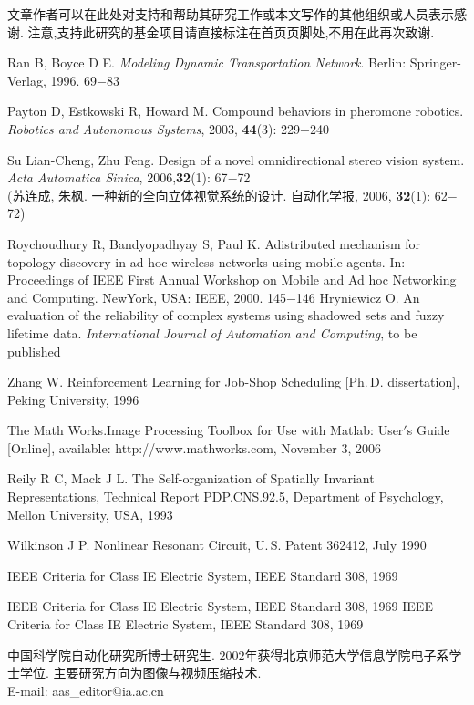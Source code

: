 \documentclass{Style/aas}
\begin{document}
\begin{multicols}{2}
文章作者可以在此处对支持和帮助其研究工作或本文写作的其他组织或人员表示感谢.
注意,支持此研究的基金项目请直接标注在首页页脚处,不用在此再次致谢.

\begin{thebibliography}{99}
 \addtolength{\itemsep}{0.2em} 
 Ran B, Boyce D E. {\sl Modeling Dynamic Transportation Network}.
Berlin: Springer-Verlag, 1996. 69$-$83

 Payton D, Estkowski R, Howard M. Compound behaviors in pheromone robotics. {\sl Robotics and Autonomous Systems}, 2003, {\bf 44}(3): 229$-$240

 Su Lian-Cheng, Zhu Feng. Design of a novel omnidirectional stereo vision system. {\sl  Acta Automatica Sinica}, 2006,{\bf 32}(1): 67$-$72\\ (苏连成, 朱枫. 一种新的全向立体视觉系统的设计. 自动化学报, 2006, {\bf 32}(1): 62$-$72)

 Roychoudhury R, Bandyopadhyay S, Paul K. Adistributed mechanism for topology discovery in ad hoc wireless networks using mobile agents. In: Proceedings of IEEE First Annual Workshop on Mobile and Ad hoc Networking and Computing. NewYork, USA: IEEE, 2000. 145$-$146
  Hryniewicz O. An evaluation of the reliability of complex systems using shadowed sets and fuzzy lifetime data. {\sl International Journal of Automation and Computing}, to be published
 
  Zhang W. Reinforcement Learning for Job-Shop Scheduling [Ph.\,D.
dissertation], Peking University, 1996

 The Math Works.Image Processing Toolbox for Use with Matlab: User$'$s Guide [Online], available: http://www.mathworks.com, November 3, 2006

 Reily R C, Mack J L. The Self-organization of Spatially Invariant
Representations, Technical Report PDP.CNS.92.5, Department of
Psychology, Mellon University, USA, 1993

 Wilkinson J P. Nonlinear Resonant Circuit, U.\,S. Patent 362412, July 1990

 IEEE Criteria for Class IE Electric System, IEEE Standard 308, 1969

 IEEE Criteria for Class IE Electric System, IEEE Standard 308, 1969
 IEEE Criteria for Class IE Electric System, IEEE Standard 308, 1969
\end{thebibliography}

\begin{biography}
\quad
中国科学院自动化研究所博士研究生.
2002年获得北京师范大学信息学院电子系学士学位.
主要研究方向为图像与视频压缩技术.\\E-mail: aas\_editor@ia.ac.cn


\end{biography}
\end{multicols}
\end{document}
